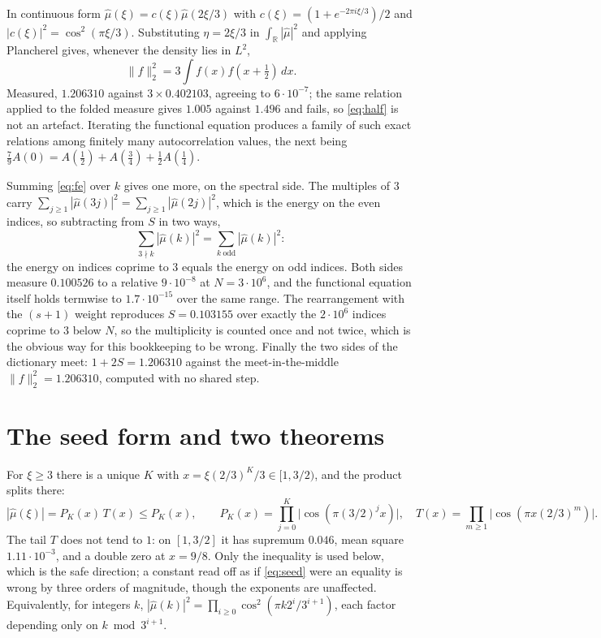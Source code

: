 \documentclass[11pt]{article}
\theoremstyle{remark}
\begin{document}
In continuous form $\hat\mu(\xi)=c(\xi)\hat\mu(2\xi/3)$ with $c(\xi)=(1+e^{-2\pi i\xi/3})/2$ and
$|c(\xi)|^2=\cos^2(\pi\xi/3)$. Substituting $\eta=2\xi/3$ in $\int_{\mathbb R}|\hat\mu|^2$ and applying
Plancherel gives, whenever the density lies in $L^2$,
\begin{equation}\label{eq:half}
  \|f\|_2^2=3\int f(x)f(x+\tfrac12)\,dx .
\end{equation}
Measured, $1.206310$ against $3\times0.402103$, agreeing to $6\cdot10^{-7}$; the same relation applied to
the folded measure gives $1.005$ against $1.496$ and fails, so \eqref{eq:half} is not an artefact.
Iterating the functional equation produces a family of such exact relations among finitely many
autocorrelation values, the next being $\tfrac79A(0)=A(\tfrac12)+A(\tfrac34)+\tfrac12A(\tfrac14)$.

Summing \eqref{eq:fe} over $k$ gives one more, on the spectral side. The multiples of $3$ carry
$\sum_{j\ge1}|\hat\mu(3j)|^2=\sum_{j\ge1}|\hat\mu(2j)|^2$, which is the energy on the even indices, so
subtracting from $S$ in two ways,
\[
  \sum_{3\nmid k}|\hat\mu(k)|^2=\sum_{k\ \mathrm{odd}}|\hat\mu(k)|^2 :
\]
the energy on indices coprime to $3$ equals the energy on odd indices. Both sides measure $0.100526$ to
a relative $9\cdot10^{-8}$ at $N=3\cdot10^6$, and the functional equation itself holds termwise to
$1.7\cdot10^{-15}$ over the same range. The rearrangement with the $(s+1)$ weight reproduces
$S=0.103155$ over exactly the $2\cdot10^6$ indices coprime to $3$ below $N$, so the multiplicity is
counted once and not twice, which is the obvious way for this bookkeeping to be wrong. Finally the two
sides of the dictionary meet: $1+2S=1.206310$ against the meet-in-the-middle $\|f\|_2^2=1.206310$,
computed with no shared step.

\section{The seed form and two theorems}

For $\xi\ge3$ there is a unique $K$ with $x=\xi(2/3)^K/3\in[1,3/2)$, and the product splits there:
\begin{equation}\label{eq:seed}
  |\hat\mu(\xi)|=P_K(x)\,T(x)\le P_K(x),\qquad
  P_K(x)=\prod_{j=0}^{K}\bigl|\cos(\pi(3/2)^jx)\bigr|,\quad
  T(x)=\prod_{m\ge1}\bigl|\cos(\pi x(2/3)^m)\bigr| .
\end{equation}
The tail $T$ does not tend to $1$: on $[1,3/2]$ it has supremum $0.046$, mean square $1.11\cdot10^{-3}$,
and a double zero at $x=9/8$. Only the inequality is used below, which is the safe direction; a constant
read off as if \eqref{eq:seed} were an equality is wrong by three orders of magnitude, though the
exponents are unaffected. Equivalently, for integers $k$,
$|\hat\mu(k)|^2=\prod_{i\ge0}\cos^2(\pi k2^i/3^{i+1})$, each factor depending only on $k \bmod 3^{i+1}$.
\end{document}
